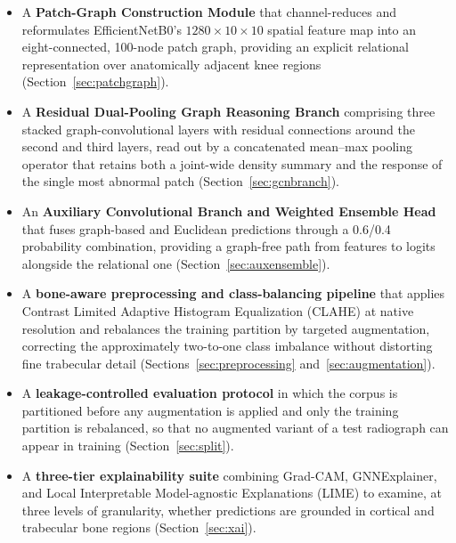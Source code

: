 \documentclass[journal]{IEEEtran}
\begin{document}
\begin{itemize}
    \item A \textbf{Patch-Graph Construction Module} that channel-reduces and
    reformulates EfficientNetB0's $1280\times10\times10$ spatial feature map
    into an eight-connected, 100-node patch graph, providing an explicit
    relational representation over anatomically adjacent knee regions
    (Section~\ref{sec:patchgraph}).

    \item A \textbf{Residual Dual-Pooling Graph Reasoning Branch} comprising
    three stacked graph-convolutional layers with residual connections around
    the second and third layers, read out by a concatenated mean--max pooling
    operator that retains both a joint-wide density summary and the response of
    the single most abnormal patch (Section~\ref{sec:gcnbranch}).

    \item An \textbf{Auxiliary Convolutional Branch and Weighted Ensemble Head}
    that fuses graph-based and Euclidean predictions through a 0.6/0.4
    probability combination, providing a graph-free path from features to logits
    alongside the relational one (Section~\ref{sec:auxensemble}).

    \item A \textbf{bone-aware preprocessing and class-balancing pipeline}
    that applies Contrast Limited Adaptive Histogram Equalization (CLAHE) at
    native resolution and rebalances the training partition by targeted
    augmentation, correcting the approximately two-to-one class imbalance
    without distorting fine trabecular detail (Sections~\ref{sec:preprocessing}
    and~\ref{sec:augmentation}).

    \item A \textbf{leakage-controlled evaluation protocol} in which the corpus
    is partitioned before any augmentation is applied and only the training
    partition is rebalanced, so that no augmented variant of a test radiograph
    can appear in training (Section~\ref{sec:split}).

    \item A \textbf{three-tier explainability suite} combining Grad-CAM,
    GNNExplainer, and Local Interpretable Model-agnostic Explanations (LIME) to
    examine, at three levels of granularity, whether predictions are grounded in
    cortical and trabecular bone regions (Section~\ref{sec:xai}).
\end{itemize}
\end{document}
